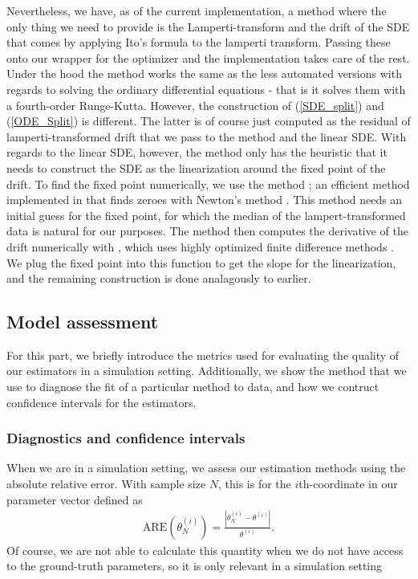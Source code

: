 Nevertheless, we have, as of the current implementation, a method where the only thing we need to provide is the Lamperti-transform and the drift of the SDE that comes by applying Ito's formula to the lamperti transform. Passing these onto our wrapper for the optimizer and the implementation takes care of the rest. Under the hood the method works the same as the less automated versions with regards to solving the ordinary differential equations - that is it solves them with a fourth-order Runge-Kutta. However, the construction of (\ref{SDE_split}) and (\ref{ODE_Split}) is different. The latter is of course just computed as the residual of lamperti-transformed drift that we pass to the method and the linear SDE. With regards to the linear SDE, however, the method only has the heuristic that it needs to construct the SDE as the linearization around the fixed point of the drift. To find the fixed point numerically, we use the method ; an efficient method implemented in  that finds zeroes with Newton's method \cite{nleqslv}. This method needs an initial guess for the fixed point, for which the median of the lampert-transformed data is natural for our purposes. The method then computes the derivative of the drift numerically with , which uses highly optimized finite difference methods \cite{numDeriv}. We plug the fixed point into this function to get the slope for the linearization, and the remaining construction is done analagously to earlier.
\subsection{Model assessment}
For this part, we briefly introduce the metrics used for evaluating the quality of our estimators in a simulation setting. Additionally, we show the method that we use to diagnose the fit of a particular method to data, and how we contruct confidence intervals for the estimators.
\subsubsection{Diagnostics and confidence intervals}
When we are in a simulation setting, we assess our estimation methods using the absolute relative error. With sample size $N$, this is for the $i$th-coordinate in our parameter vector defined as
\begin{align}
    \mathrm{ARE}\left(\theta_N^{(i)}\right) = \frac{\left|\theta_N^{(i)} - \theta^{(i)}\right|}{\theta^{(i)}}. \label{eq:ARE}
\end{align}
Of course, we are not able to calculate this quantity when we do not have access to the ground-truth parameters, so it is only relevant in a simulation setting

